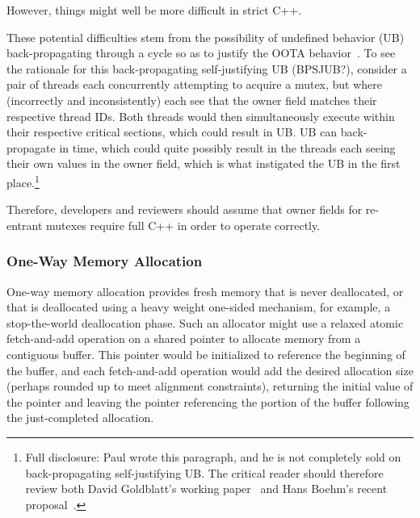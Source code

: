 \documentclass[10]{article}
\begin{document}

However, things might well be more difficult in strict C++.

These potential difficulties stem from the possibility of undefined
behavior (UB) back-propagating through a cycle so as to justify the OOTA
behavior~\cite{DavidGoldblatt2019NoElegantOOTA}.
To see the rationale for this back-propagating self-justifying UB (BPSJUB?),
consider a pair of threads each concurrently attempting to acquire a
mutex, but where (incorrectly and inconsistently) each see that the
owner field matches their respective thread IDs.
Both threads would then simultaneously execute within their respective
critical sections, which could result in UB.
UB can back-propagate in time, which could quite possibly result
in the threads each seeing their own values in the owner field, which
is what instigated the UB in the first place.\footnote{
	Full disclosure: Paul wrote this paragraph, and he is not
	completely sold on back-propagating self-justifying UB.  The
	critical reader should therefore review both David Goldblatt's
	working paper~\cite{DavidGoldblatt2019NoElegantOOTA} and Hans
	Boehm's recent proposal~\cite{HansBoehm2020ConcurrentUB}.}


Therefore, developers and reviewers should assume that owner fields for
re-entrant mutexes require full C++ in order to operate correctly.

\subsubsection{One-Way Memory Allocation}
\label{sec:One-Way Memory Allocation}

One-way memory allocation provides fresh memory that is never deallocated,
or that is deallocated using a heavy weight one-sided mechanism, for
example, a stop-the-world deallocation phase.
Such an allocator might use a relaxed atomic fetch-and-add operation
on a shared pointer to allocate memory from a contiguous buffer.
This pointer would be initialized to reference the beginning of
the buffer, and each fetch-and-add operation would add the desired
allocation size (perhaps rounded up to meet alignment constraints),
returning the initial value of the pointer and leaving the pointer
referencing the portion of the buffer following the just-completed
allocation.
\end{document}
